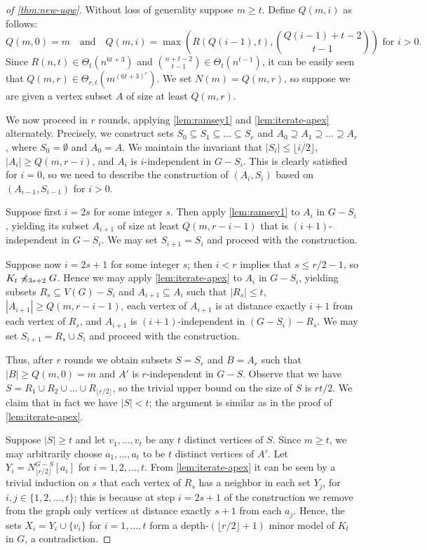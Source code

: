 \begin{proof}[of \cref{thm:new-uqw}]
Without loss of generality suppose $m\geq t$.
Define $Q(m,i)$ as follows: $$Q(m,0)=m\quad\textrm{and}\quad Q(m,i)=\max \left (R(Q(i-1),t),\binom{Q(i-1)+t-2}{t-1}\right)\textrm{ for }i>0.$$
Since $R(n,t)\in \Theta_{t}(n^{6t+3})$ and $\binom{n+t-2}{t-1}\in \Theta_t(n^{t-1})$, it can be easily seen that $Q(m,r)\in \Theta_{r,t}(m^{(6t+3)^r})$.
We set $N(m)=Q(m,r)$, so suppose we are given a vertex subset $A$ of size at least $Q(m,r)$.

We now proceed in $r$ rounds, applying \cref{lem:ramsey1} and \cref{lem:iterate-apex} alternately.
Precisely, we construct sets $S_0\subseteq S_1\subseteq \ldots\subseteq S_r$ and $A_0\supseteq A_1\supseteq \ldots\supseteq A_r$, where $S_0=\emptyset$ and $A_0=A$.
We maintain the invariant that $|S_i|\leq \lfloor i/2\rfloor$, $|A_i|\geq Q(m,r-i)$, and $A_i$ is $i$-independent in $G-S_i$. This is clearly satisfied for $i=0$, so we need to describe the construction
of $(A_i,S_i)$ based on $(A_{i-1},S_{i-1})$ for $i>0$.

Suppose first $i=2s$ for some integer $s$. Then apply \cref{lem:ramsey1} to $A_i$ in $G-S_i$, yielding its subset $A_{i+1}$ of size at least $Q(m,r-i-1)$ that is $(i+1)$-independent in $G-S_i$. We may set $S_{i+1}=S_i$
and proceed with the construction.

Suppose now $i=2s+1$ for some integer $s$; then $i<r$ implies that $s\leq r/2-1$, so $K_{t}\not\preccurlyeq_{3s+2} G$. 
Hence we may apply \cref{lem:iterate-apex} to $A_i$ in $G-S_i$, yielding subsets $R_{s}\subseteq V(G)-S_i$ and $A_{i+1}\subseteq A_i$ 
such that $|R_{s}|\leq t$, $|A_{i+1}|\geq Q(m,r-i-1)$, each vertex of $A_{i+1}$ is at distance exactly $i+1$ from each vertex of $R_s$, and $A_{i+1}$ is $(i+1)$-independent in $(G-S_{i})-R_s$.
We may set $S_{i+1}=R_s\cup S_i$ and proceed with the construction.

Thus, after $r$ rounds we obtain subsets $S=S_r$ and $B=A_r$ such that $|B|\geq Q(m,0)=m$ and $A'$ is $r$-independent in $G-S$. Observe that we have $S=R_1\cup R_2\cup \ldots\cup R_{\lfloor r/2\rfloor}$,
so the trivial upper bound on the size of $S$ is $rt/2$. We claim that in fact we have $|S|<t$; the argument is similar as in the proof of \cref{lem:iterate-apex}.

Suppose $|S|\geq t$ and let $v_1,\ldots,v_t$ be any $t$ distinct vertices of $S$.
Since $m\geq t$, we may arbitrarily choose $a_1,\ldots,a_t$ to be $t$ distinct vertices of $A'$.
Let $Y_i=N^{G-S}_{\lfloor r/2\rfloor}[a_i]$ for $i=1,2,\ldots,t$.
From \cref{lem:iterate-apex} it can be seen by a trivial induction on $s$ that each vertex of $R_s$ has a neighbor in each set $Y_j$, for $i,j\in \{1,2,\ldots,t\}$; 
this is because at step $i=2s+1$ of the construction we remove from the graph only vertices at distance exactly $s+1$ from each $a_j$.
Hence, the sets $X_i=Y_i\cup \{v_i\}$ for $i=1,\ldots,t$ form a depth-$(\lfloor r/2\rfloor+1)$ minor model of $K_t$ in $G$, a contradiction. 
\end{proof}

